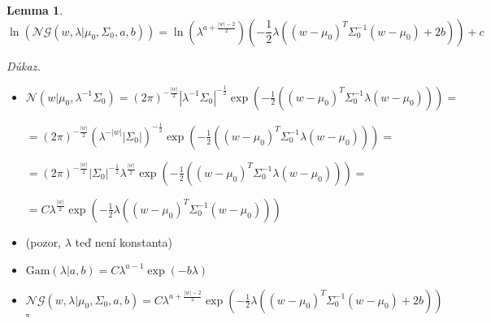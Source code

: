 \documentclass{article}
\newenvironment{pitemize}{
\begin{itemize}
  \setlength{\itemsep}{5pt}
  \setlength{\parskip}{0pt}
  \setlength{\parsep}{0pt}
}{\end{itemize}}
\newenvironment{pproof}{
\noindent\emph{Důkaz.}
\begin{pitemize}
}{\hfill$\square$\end{pitemize}}
\newcommand{\NN}{\mathcal{N}}
\newcommand{\NoG}{\mathcal{NG}}
\newcommand{\Gam}{\mathrm{Gam}}
\newtheorem{lemma}{Lemma}
\theoremstyle{definition}
\begin{document}
\begin{lemma}
\label{normalgammalog}
$$\ln\left(\NoG\left(w,\lambda|\mu_0,\Sigma_0,a,b\right)
\right)= \ln\left(\lambda^{a+\frac{\left|w\right|-2}{2}}\right)
\left(-\frac{1}{2}\lambda\left(\left(w-\mu_0\right)^T \Sigma_0^{-1}\left(w- \mu_0\right)+2b\right)\right)+c$$
\end{lemma}
\begin{pproof}
\item $\NN(w|\mu_0,\lambda^{-1}\Sigma_0) = (2\pi)^{-\frac{\left|w\right|}{2}} 
\left|\lambda^{-1}\Sigma_0\right| ^{-\frac{1}{2}} \exp\left(-\frac{1}{2}\left(\left(w-\mu_0\right)^T \Sigma_0^{-1}\lambda\left(w- \mu_0\right)\right)\right)=$

$=(2\pi)^{-\frac{\left|w\right|}{2}} 
\left(\lambda^{-\left|w\right|}\left|\Sigma_0\right|\right) ^{-\frac{1}{2}} \exp\left(-\frac{1}{2}\left(\left(w-\mu_0\right)^T \Sigma_0^{-1}\lambda\left(w- \mu_0\right)\right)\right)=$

$=(2\pi)^{-\frac{\left|w\right|}{2}} 
\left|\Sigma_0\right|^{-\frac{1}{2}}
\lambda^{\frac{\left|w\right|}{2}} \exp\left(-\frac{1}{2}\left(\left(w-\mu_0\right)^T \Sigma_0^{-1}\lambda\left(w- \mu_0\right)\right)\right)=$

$=C
\lambda^{\frac{\left|w\right|}{2}} \exp\left(-\frac{1}{2}\lambda\left(\left(w-\mu_0\right)^T \Sigma_0^{-1}\left(w- \mu_0\right)\right)\right)$
\item (pozor, $\lambda$ teď není konstanta)

\item $\Gam(\lambda|a,b)=C\lambda^{a-1}\exp(-b\lambda)$

\item $\NoG\left(w,\lambda|\mu_0,\Sigma_0,a,b\right)=C\lambda^{a+\frac{\left|w\right|-2}{2}}\exp\left(-\frac{1}{2}\lambda\left(\left(w-\mu_0\right)^T \Sigma_0^{-1}\left(w- \mu_0\right)+2b\right)\right)$
\end{pproof}
\end{document}
